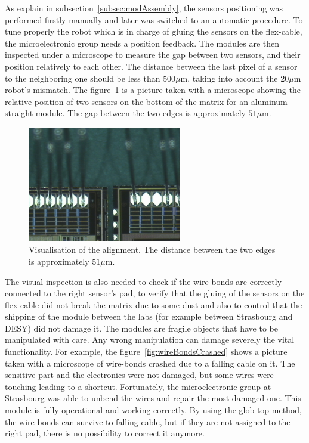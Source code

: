   As explain in subsection~\ref{subsec:modAssembly}, the sensors positioning was performed firstly manually and later was switched to an automatic procedure.
  To tune properly the robot which is in charge of gluing the sensors on the flex-cable, the microelectronic group needs a position feedback.
  The modules are then inspected under a microscope to measure the gap between two sensors, and their position relatively to each other.
  The distance between the last pixel of a sensor to the neighboring one should be less than $500 \mu\text{m}$, taking into account the $20\mu\text{m}$ robot's mismatch.
  The figure~\ref{fig:visAlign} is a picture taken with a microscope showing the relative position of two sensors on the bottom of the matrix for an aluminum straight module.
  The gap between the two edges is approximately $51 \mu\text{m}$. 
  
  \begin{figure}
    \centering
    \includegraphics[width=0.6\textwidth]{Pictures/labTests/alignment_sensors.jpg}
    \caption{Visualisation of the alignment. The distance between the two edges is approximately $51 \mu\text{m}$.}
    \label{fig:visAlign}
  \end{figure}
  
  The visual inspection is also needed to check if the wire-bonds are correctly connected to the right sensor's pad, to verify that the gluing of the sensors on the flex-cable did not break the matrix due to some dust and also to control that the shipping of the module between the labs (for example between Strasbourg and DESY) did not damage it.
  The modules are fragile objects that have to be manipulated with care.
  Any wrong manipulation can damage severely the vital functionality.
  For example, the figure~\ref{fig:wireBondsCrashed} shows a picture taken with a microscope of wire-bonds crashed due to a falling cable on it.
  The sensitive part and the electronics were not damaged, but some wires were touching leading to a shortcut.
  Fortunately, the microelectronic group at Strasbourg was able to unbend the wires and repair the most damaged one.
  This module is fully operational and working correctly.
  By using the glob-top method, the wire-bonds can survive to falling cable, but if they are not assigned to the right pad, there is no possibility to correct it anymore.

